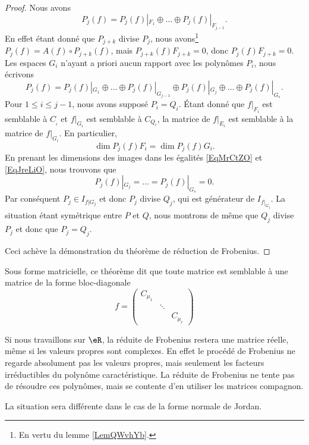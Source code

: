 \begin{proof}
    Nous avons 
    \begin{equation}    \label{EqMrCtZO}
        P_j(f)=P_j(f)|_{F_1}\oplus\ldots\oplus P_j(f)|_{F_{j-1}}.
    \end{equation}
    En effet étant donné que \( P_{j+k}\) divise \( P_j\), nous avons\footnote{En vertu du lemme \ref{LemQWvhYb}.} \( P_{j}(f)=A(f)\circ P_{j+k}(f)\), mais \( P_{j+k}(f)F_{j+k}=0\), donc \( P_j(f)F_{j+k}=0\). Les espaces \( G_i\) n'ayant a priori aucun rapport avec les polynômes \( P_i\), nous écrivons
    \begin{equation}    \label{EqJreLiO}
        P_j(f)=P_j(f)|_{G_1}\oplus\ldots\oplus P_j(f)|_{G_{j-1}}\oplus P_j(f)|_{G_j}\oplus\ldots\oplus P_j(f)|_{G_s}.
    \end{equation}
    Pour \( 1\leq i\leq j-1\), nous avons supposé \( P_i=Q_i\). Étant donné que \( f|_{F_i}\) est semblable à \( C_{_i}\) et \( f|_{G_i}\) est semblable à \( C_{Q_i}\), la matrice de \( f|_{E_i}\) est semblable à la matrice de \( f|_{G_i}\). En particulier,
    \begin{equation}
        \dim P_j(f)F_i=\dim P_j(f)G_i.
    \end{equation}
    En prenant les dimensions des images dans les égalités \eqref{EqMrCtZO} et \eqref{EqJreLiO}, nous trouvons que
    \begin{equation}
        P_j(f)|_{G_j}=\ldots=P_j(f)|_{G_s}=0.
    \end{equation}
    Par conséquent \( P_j\in I_{f|G_j}\) et donc \( P_j\) divise \( Q_j\), qui est générateur de \( I_{f|_{G_j}}\). La situation étant symétrique entre \( P\) et \( Q\), nous montrons de même que \( Q_j\) divise \( P_j\) et donc que \( P_j=Q_j\).

    Ceci achève la démonstration du théorème de réduction de Frobenius.

\end{proof}


Sous forme matricielle, ce théorème dit que toute matrice est semblable à une matrice de la forme bloc-diagonale
\begin{equation}
    f=\begin{pmatrix}
        C_{\mu_1}    &       &       \\
            &   \ddots    &       \\
            &       &   C_{\mu_r}
    \end{pmatrix}
\end{equation}

\begin{remark}
    Si nous travaillons sur \( \eR\), la réduite de Frobenius restera une matrice réelle, même si les valeurs propres sont complexes. En effet le procédé de Frobenius ne regarde absolument pas les valeurs propres, mais seulement les facteurs irréductibles du polynôme caractéristique. La réduite de Frobenius ne tente pas de résoudre ces polynômes, mais se contente d'en utiliser les matrices compagnon.

    La situation sera différente dans le cas de la forme normale de Jordan.
\end{remark}

